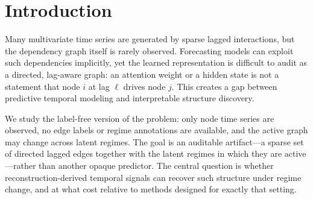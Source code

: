 \documentclass[sigconf,anonymous]{acmart}
\begin{document}


\maketitle

\section{Introduction}

Many multivariate time series are generated by sparse lagged interactions, but the dependency graph itself is rarely observed.
Forecasting models can exploit such dependencies implicitly, yet the learned representation is difficult to audit as a directed, lag-aware graph: an attention weight or a hidden state is not a statement that node $i$ at lag $\ell$ drives node $j$.
This creates a gap between predictive temporal modeling and interpretable structure discovery.

We study the label-free version of the problem: only node time series are observed, no edge labels or regime annotations are available, and the active graph may change across latent regimes.
The goal is an auditable artifact---a sparse set of directed lagged edges together with the latent regimes in which they are active---rather than another opaque predictor.
The central question is whether reconstruction-derived temporal signals can recover such structure under regime change, and at what cost relative to methods designed for exactly that setting.
\end{document}
